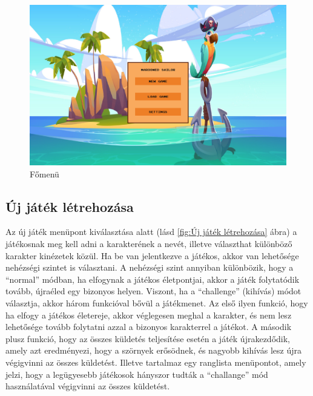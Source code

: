 \begin{figure}[hbt]
    \centering
    \includegraphics[width=14.0truecm]{images/mainmenu.png}
    \caption{Főmenü}
    \label{fig:Főmenü}
\end{figure}


\subsection{Új játék létrehozása}
 Az új játék menüpont kiválasztása alatt (lásd \ref{fig:Új játék létrehozása} ábra) a játékosnak meg kell adni a karakterének a nevét, illetve választhat különböző karakter kinézetek közül. Ha be van jelentkezve a játékos, akkor van lehetősége nehézségi szintet is választani.
A nehézségi szint annyiban különbözik, hogy a ``normal'' módban, ha elfogynak a játékos életpontjai, akkor a játék folytatódik tovább, újraéled egy bizonyos helyen. Viszont, ha a ``challenge'' (kihívás) módot választja, akkor három funkcióval bővül a játékmenet. Az első ilyen funkció, hogy ha elfogy a játékos életereje, akkor véglegesen meghal a karakter, és nem lesz lehetősége tovább folytatni azzal a bizonyos karakterrel a játékot. A második plusz funkció, hogy az összes küldetés teljesítése esetén a játék újrakezdődik, amely azt eredményezi, hogy a szörnyek erősödnek, és nagyobb kihívás lesz újra végigvinni az összes küldetést. Illetve tartalmaz egy ranglista menüpontot, amely jelzi, hogy a legügyesebb játékosok hányszor tudták a ``challange'' mód használatával végigvinni az összes küldetést.

